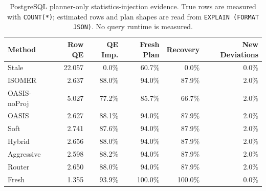 \begin{table}[t]
  \centering
  \small
  \caption{PostgreSQL planner-only statistics-injection evidence. True rows are measured with \texttt{COUNT(*)}; estimated rows and plan shapes are read from \texttt{EXPLAIN (FORMAT JSON)}. No query runtime is measured.}
  \label{tab:postgres_planner_stats_injection}
  \setlength{\tabcolsep}{4pt}
  \begin{tabular}{lrrrrr}
    \toprule
    Method & Row QE & QE Imp. & Fresh Plan & Recovery & New Deviations \\
    \midrule
    Stale & 22.057 & 0.0\% & 60.7\% & 0.0\% & 0.0\% \\
    ISOMER & 2.637 & 88.0\% & 94.0\% & 87.9\% & 2.0\% \\
    OASIS-noProj & 5.027 & 77.2\% & 85.7\% & 66.7\% & 2.0\% \\
    OASIS & 2.627 & 88.1\% & 94.0\% & 87.9\% & 2.0\% \\
    Soft & 2.741 & 87.6\% & 94.0\% & 87.9\% & 2.0\% \\
    Hybrid & 2.656 & 88.0\% & 94.0\% & 87.9\% & 2.0\% \\
    Aggressive & 2.598 & 88.2\% & 94.0\% & 87.9\% & 2.0\% \\
    Router & 2.650 & 88.0\% & 94.0\% & 87.9\% & 2.0\% \\
    Fresh & 1.355 & 93.9\% & 100.0\% & 100.0\% & 0.0\% \\
    \bottomrule
  \end{tabular}
\end{table}
